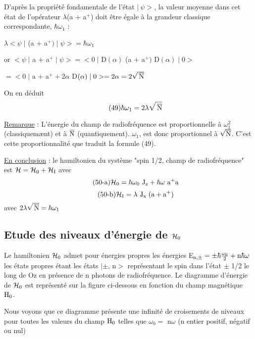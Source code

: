 D'après la propriété fondamentale de l'état $|\ \psi >$, la valeur moyenne dans cet état de
l'opérateur $\lambda$(a $+$ a$^+$) doit être égale à la grandeur classique correspondante, $\hbar\omega_1$ :
\begin{center}
$\lambda<\psi\;|$ (a $+$ a$^+)\;|\;\psi>=\hbar\omega_1$
\end{center}
or $<\psi\;|$ a $+$ a$^+\;|\;\psi>=<0\;|$ D$(\alpha)$ (a $+$ a$^+)$ D$(\alpha)\;|\;0>$
\begin{center}
$=<0\;|$ a $+$ a$^++2\alpha$ D$(\alpha)\;|\;0>=2\alpha=2\sqrt{\,\overline{\text{N}}}$
\end{center}
On en déduit
\[
\tag{49}\hbar\omega_1=2\lambda\sqrt{\,\overline{\text{N}}}
\]

\ul{Remarque} : L'énergie du champ de radiofréquence est proportionnelle à $\omega_1^2$
(classiquemænt) et à $\overline{\text{N}}$ (quantiquement). $\omega_1$, est donc proportionnel
à $\sqrt{\overline{\text{N}}}$.
C'est cette proportionnalité que traduit la formule (49).

\ul{En conclusion} : le hamiltonien du système "spin 1/2, champ de radiofréquence"
est $\mathcal{H}=\mathcal{H}_0+\mathcal{H}_{\text{I}}$
avec
\[
\tag{50-a}\mathcal{H}_0=\hbar\omega_0\text{ J}_{\text{z}}+\hbar\omega\text{ a}^+\text{a}
\]
\[
\tag{50-b}\mathcal{H}_{\text{I}}=\lambda\text{ J}_{\text{x }}(\text{a}+\text{a}^+)
\]
avec $2\lambda\sqrt{\,\overline{\text{N}}}=\hbar\omega_1$
\subsection{Etude des niveaux d'énergie de $\mathcal{H}_0$}%
Le hamiltonien $\mathcal{H}_0$ admet pour énergies propres les énergies
E$_{\text{n},\pm}=\pm\hbar\frac{\omega_0}{2}+\text{n}\hbar\omega$
les états propres étant les états $|\pm$, n$>$ représentant le spin dans l'état
$\pm$ 1/2 le long de Oz en présence de n photons de radiofréquence.
Le diagramme d'énergie de $\mathcal{H}_0$ est représenté sur la figure ci-dessous en
fonction du champ magnétique $\text{H}_0$.

Nous voyons que ce diagramme présente une infinité de croisements de
niveaux pour toutes les valeurs du champ $\text{H}_0$ telles que $\omega_0=$ n$\omega$ (n entier positif,
négatif ou nul)
\begin{center}  \end{center}

